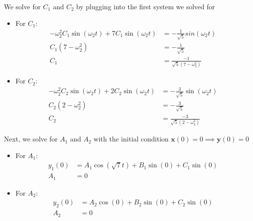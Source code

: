 \documentclass[12pt]{article}
\begin{document}
We solve for $C_1$ and $C_2$ by plugging into the first system we solved for
\begin{itemize}
    \item For $C_1$:
          \begin{align*}
              -\omega_2^2 C_1 \sin(\omega_2 t) + 7C_1 \sin(\omega_2t) & = -\frac{1}{\sqrt{5}}sin(\omega_2t) \\
              C_1(7-\omega_2^2)                                       & = -\frac{1}{\sqrt{5}}               \\
              C_1                                                     & = \frac{-1}{\sqrt{5}(7-\omega_2^2)}
          \end{align*}
    \item For $C_2$:
          \begin{align*}
              -\omega_2^2 C_2 \sin(\omega_2 t) + 2C_2 \sin(\omega_2t) & = -\frac{3}{\sqrt{5}} \sin(\omega_2t) \\
              C_2(2-\omega_2^2)                                       & = -\frac{3}{\sqrt{5}}                 \\
              C_2                                                     & = \frac{-3}{\sqrt{5}(2-\omega_2^2)}
          \end{align*}
\end{itemize}

Next, we solve for $A_1$ and $A_2$ with the initial condition $\mathbf{x}(0) = 0 \implies{} \mathbf{y}(0) = 0$
\begin{itemize}
    \item For $A_1$:
          \begin{align*}
              y_1(0) & = A_1\cos(\sqrt{7}t) + B_1\sin(0) + C_1 \sin(0) \\
              A_1    & = 0
          \end{align*}
    \item For $A_2$:
          \begin{align*}
              y_2(0) & = A_2\cos(0) + B_2\sin(0) + C_2 \sin(0) \\
              A_2    & = 0
          \end{align*}
\end{itemize}
\end{document}
